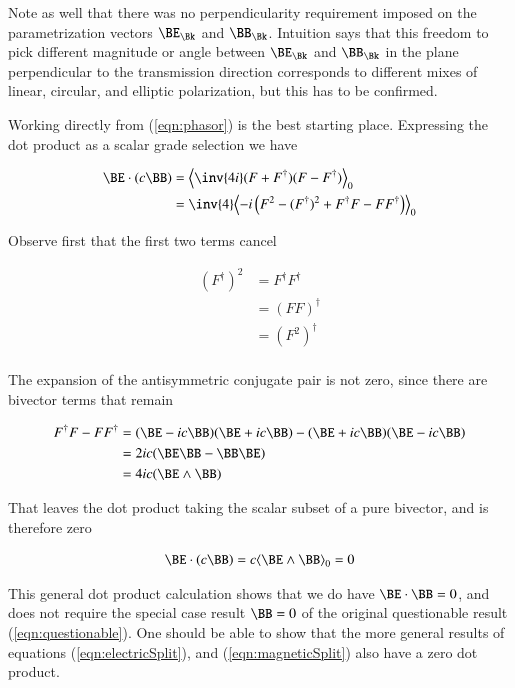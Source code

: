 Note as well that there was no perpendicularity requirement imposed on the parametrization vectors $\BE_\Bk$ and $\BB_\Bk$.  Intuition says that this freedom to pick different magnitude or angle between $\BE_\Bk$ and $\BB_\Bk$ in the plane perpendicular to the transmission direction corresponds to different mixes of linear, circular, and elliptic polarization, but this has to be confirmed.

Working directly from (\ref{eqn:phasor}) is the best starting place.  Expressing the dot product as a scalar grade selection we have

\begin{align*}
\BE \cdot (c \BB) 
&=
\gpgradezero{
\inv{4i}(F + F^\dagger) (F - F^\dagger)
} \\
&=
\inv{4} \gpgradezero{
-i \left( F^2 - (F^\dagger)^2 + F^\dagger F - F F^\dagger \right) } \\
\end{align*}

Observe first that the first two terms cancel

\begin{align*}
(F^\dagger)^2  
&=
F^\dagger F^\dagger \\
&=
(F F)^\dagger \\
&=
(F^2)^\dagger \\
\end{align*}

The expansion of the antisymmetric conjugate pair is not zero, since there
are bivector terms that remain

\begin{align*}
F^\dagger F - F F^\dagger 
&=
(\BE - i c \BB)(\BE + i c \BB) - (\BE + i c \BB)(\BE - i c \BB) \\
&=
2 i c (\BE \BB - \BB \BE) \\
&=
4 i c (\BE \wedge \BB)
\end{align*}

That leaves the dot product taking the scalar subset of a pure bivector, and
is therefore zero

\begin{align}\label{eqn:blah}
\BE \cdot (c \BB) = {c} \gpgradezero{ \BE \wedge \BB } = 0
\end{align}

This general dot product calculation shows that we do have $\BE \cdot \BB = 0$, and does not require the special case result $\BB = 0$ of the original questionable result (\ref{eqn:questionable}).  One should be able to show that the more general results of equations (\ref{eqn:electricSplit}), and (\ref{eqn:magneticSplit}) also have a zero dot product.

